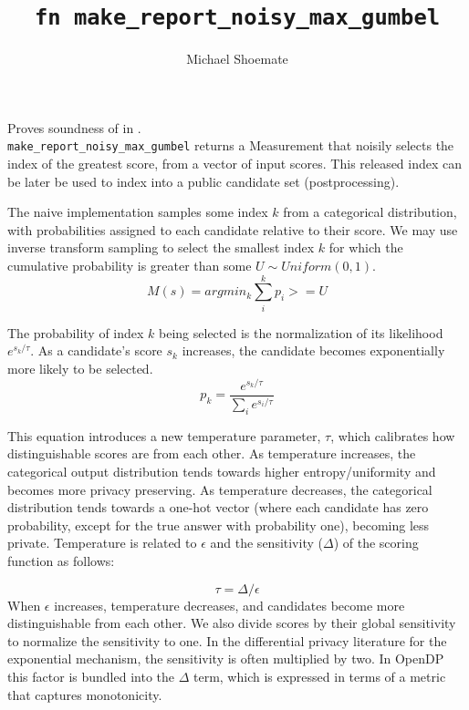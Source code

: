 \documentclass{article}
\title{\texttt{fn make\_report\_noisy\_max\_gumbel}}
\author{Michael Shoemate}
\begin{document}
  
\maketitle 
 
Proves soundness of   
in .\\ 
\texttt{make\_report\_noisy\_max\_gumbel} returns a Measurement that  
noisily selects the index of the greatest score, from a vector of input scores. 
This released index can be later be used to index into a public candidate set (postprocessing). 
 
The naive implementation samples some index $k$ from a categorical distribution,  
with probabilities assigned to each candidate relative to their score. 
We may use inverse transform sampling to select the smallest index $k$ for which the cumulative probability is greater than some $U \sim Uniform(0, 1)$. 
\begin{equation}  
    \label{m-naive}  
    M(s) = argmin_k \sum_i^k p_i >= U 
\end{equation}  
 
The probability of index $k$ being selected is the normalization of its likelihood $e^{s_k / \tau}$. 
As a candidate's score $s_k$ increases, the candidate becomes exponentially more likely to be selected. 
\begin{equation} 
    \label{prob-of-k} 
    p_k = \frac{e^{s_k / \tau}}{\sum_i e^{s_i / \tau}} 
\end{equation} 
 
This equation introduces a new temperature parameter, $\tau$, which calibrates how distinguishable scores are from each other. 
As temperature increases, the categorical output distribution tends towards higher entropy/uniformity and becomes more privacy preserving. 
As temperature decreases, the categorical distribution tends towards a one-hot vector 
(where each candidate has zero probability, except for the true answer with probability one), 
becoming less private. 
Temperature is related to $\epsilon$ and the sensitivity ($\Delta$) of the scoring function as follows: 
 
\begin{equation} 
    \tau = \Delta / \epsilon 
\end{equation} 
When $\epsilon$ increases, temperature decreases, and candidates become more distinguishable from each other. 
We also divide scores by their global sensitivity to normalize the sensitivity to one. 
In the differential privacy literature for the exponential mechanism, the sensitivity is often multiplied by two. 
In OpenDP this factor is bundled into the $\Delta$ term, which is expressed in terms of a metric that captures monotonicity. 
 
\end{document}
